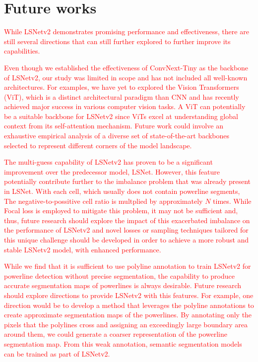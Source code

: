 \documentclass[journal]{IEEEtran}
\newcommand{\textK}[1]{\textcolor{red}{#1}}
\begin{document}
\section{Future works}

\textK{While LSNetv2 demonstrates promising performance and effectiveness, there are still several directions that can still further explored to further improve its capabilities.}

\textK{Even though we established the effectiveness of ConvNext-Tiny as the backbone of LSNetv2, our study was limited in scope and has not included all well-known architectures. For examples, we have yet to explored the Vision Transformers (ViT), which is a distinct architectural paradigm than CNN and has recently achieved major success in various computer vision tasks. A ViT can potentially be a suitable backbone for LSNetv2 since ViTs excel at understanding global context from its self-attention mechanism. Future work could involve an exhaustive empirical analysis of a diverse set of state-of-the-art backbones selected to represent different corners of the model landscape.}

\textK{The multi-guess capability of LSNetv2 has proven to be a significant improvement over the predecessor model, LSNet. However, this feature potentially contribute further to the imbalance problem that was already present in LSNet. With each cell, which usually does not contain powerline segments, The negative-to-possitive cell ratio is multplied by approximately $N$ times. While Focal loss is employed to mitigate this problem, it may not be sufficient and, thus, future research should explore the impact of this exacerbated imbalance on the performance of LSNetv2 and novel losses or sampling techniques tailored for this unique challenge should be developed in order to achieve a more robust and stable LSNetv2 model, with enhanced performance.}

\textK{While we find that it is sufficient to use polyline annotation to train LSNetv2 for powerline detection without precise segmentation, the capability to produce accurate segmentation maps of powerlines is always desirable. Future research should explore directions to provide LSNetv2 with this features. For example, one direction would be to develop a method that leverages the polyline annotations to create approximate segmentation maps of the powerlines. By annotating only the pixels that the polylines cross and assigning an exceedingly large boundary area around them, we could generate a coarser representation of the powerline segmentation map. From this weak annotation, semantic segmentation models can be trained as part of LSNetv2.}
\end{document}
